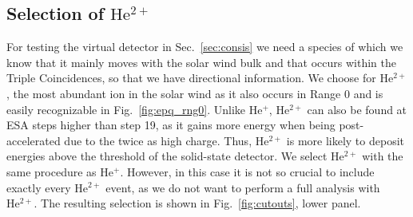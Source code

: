 \subsection{Selection of $\mathrm{He^{2+}}$}
For testing the virtual detector in Sec.~\ref{sec:consis} we need a species of which we know that it mainly moves with the solar wind bulk and that occurs within the Triple Coincidences, so that we have directional information. We choose for $\mathrm{He^{2+}}$, the most abundant ion in the solar wind \citep[][,ch. 6.1]{prlss_2004} as it also occurs in Range 0 and is easily recognizable in Fig.~\ref{fig:epq_rng0}.
Unlike $\mathrm{He^{+}}$, $\mathrm{He^{2+}}$ can also be found at ESA steps higher than step 19, as it gains more energy when being post-accelerated due to the twice as high charge. Thus, $\mathrm{He^{2+}}$ is more likely to deposit energies above the threshold of the solid-state detector. 
We select $\mathrm{He^{2+}}$ with the same procedure as $\mathrm{He^{+}}$. However, in this case it is not so crucial to include exactly every $\mathrm{He^{2+}}$ event, as we do not want to perform a full analysis with $\mathrm{He^{2+}}$. The resulting selection is shown in Fig.~\ref{fig:cutouts}, lower panel.
%
%
%
